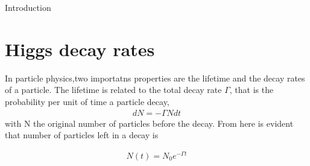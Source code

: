 \begin{chapter}{Introduction}
\section{Higgs decay rates}
In particle physics,two importatns properties are the lifetime and the decay rates of a particle. The lifetime is related to the total decay rate $\Gamma$, that is the probability per unit of time a particle decay, 
\begin{align}
    dN=-\Gamma N dt
\end{align}
with N the original number of particles before the decay. From here is evident that number of particles left in a decay is 

\begin{align}
N(t)=N_0 e^{-\Gamma t}
\end{align}



\end{chapter}
